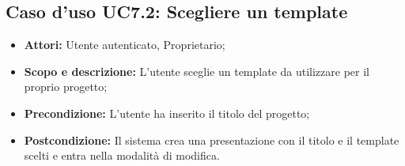 \subsection{Caso d'uso UC7.2: Scegliere un template}
\begin{itemize}
	\item \textbf{Attori:} Utente autenticato, Proprietario;
	\item \textbf{Scopo e descrizione:} L'utente sceglie un template da utilizzare per il proprio progetto;
	\item \textbf{Precondizione:} L'utente ha inserito il titolo del progetto;
	\item \textbf{Postcondizione:} Il sistema crea una presentazione con il titolo e il template scelti e entra nella modalità di modifica.
\end{itemize}